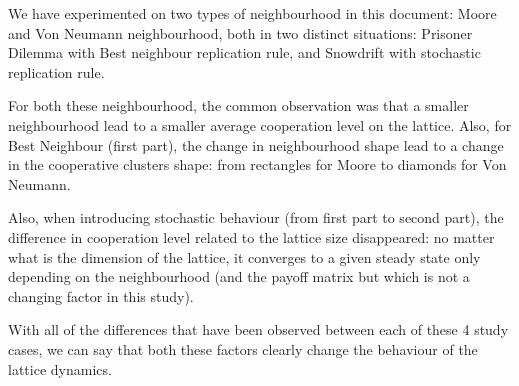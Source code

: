 \documentclass{article}
\begin{document}
We have experimented on two types of neighbourhood in this document: Moore and Von Neumann neighbourhood,
both in two distinct situations: Prisoner Dilemma with Best neighbour replication rule, and Snowdrift with
stochastic replication rule.

For both these neighbourhood, the common observation was that a smaller neighbourhood lead to a smaller
average cooperation level on the lattice. Also, for Best Neighbour (first part), the change in neighbourhood
shape lead to a change in the cooperative clusters shape: from rectangles for Moore to diamonds for Von Neumann.

Also, when introducing stochastic behaviour (from first part to second part), the difference in cooperation level
related to the lattice size disappeared: no matter what is the dimension of the lattice, it converges to a given
steady state only depending on the neighbourhood (and the payoff matrix but which is not a changing factor in
this study).

With all of the differences that have been observed between each of these 4 study cases, we can say that both
these factors clearly change the behaviour of the lattice dynamics.
\end{document}

